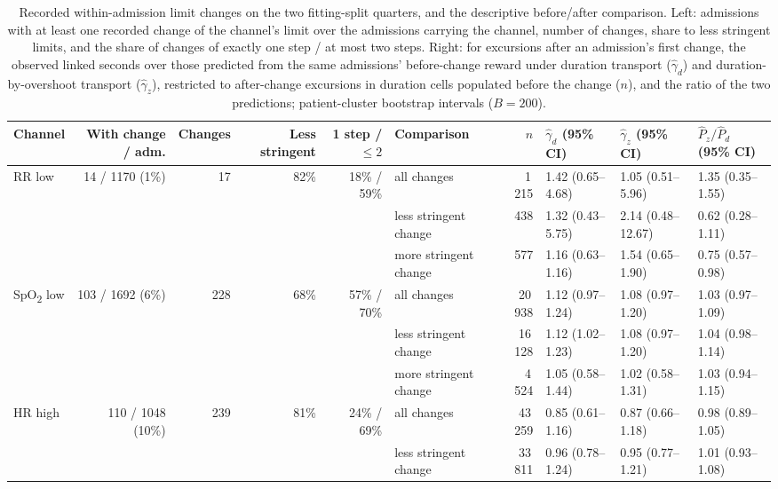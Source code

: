 \documentclass[11pt,letterpaper]{article}
\newcommand{\SpO}{SpO\textsubscript{2}}\newcommand{\tightnote}[1]{\par\smallskip{\footnotesize\raggedright #1\par}}
\begin{document}
\begin{landscape}\begin{table}[htbp]\centering\footnotesize
\setlength{\tabcolsep}{4pt}
\caption{Recorded within-admission limit changes on the two fitting-split quarters, and the descriptive before/after comparison. Left: admissions with at least one recorded change of the channel's limit over the admissions carrying the
channel, number of changes, share to less stringent limits, and the share of changes of exactly one step / at most two steps. Right: for
excursions after an admission's first change, the observed linked seconds over those predicted from the same
admissions' before-change reward under duration transport ($\hat\gamma_d$) and duration-by-overshoot transport
($\hat\gamma_z$), restricted to after-change excursions in duration cells populated before the change ($n$),
and the ratio of the two predictions; patient-cluster bootstrap intervals ($B=200$).}
\label{tab:limitchanges}
\begin{tabular}{@{}lrrrrlrlll@{}}
\toprule
Channel & With change / adm. & Changes & Less stringent & 1 step / $\le2$ & Comparison & $n$ & $\hat\gamma_d$ (95\% CI) & $\hat\gamma_z$ (95\% CI) & $\hat P_z/\hat P_d$ (95\% CI) \\
\midrule
RR low & 14 / 1170 (1\%) & 17 & 82\% & 18\% / 59\% & all changes & 1\,215 & 1.42 (0.65--4.68) & 1.05 (0.51--5.96) & 1.35 (0.35--1.55) \\
 &  &  &  &  & less stringent change & 438 & 1.32 (0.43--5.75) & 2.14 (0.48--12.67) & 0.62 (0.28--1.11) \\
 &  &  &  &  & more stringent change & 577 & 1.16 (0.63--1.16) & 1.54 (0.65--1.90) & 0.75 (0.57--0.98) \\
\addlinespace
\SpO{} low & 103 / 1692 (6\%) & 228 & 68\% & 57\% / 70\% & all changes & 20\,938 & 1.12 (0.97--1.24) & 1.08 (0.97--1.20) & 1.03 (0.97--1.09) \\
 &  &  &  &  & less stringent change & 16\,128 & 1.12 (1.02--1.23) & 1.08 (0.97--1.20) & 1.04 (0.98--1.14) \\
 &  &  &  &  & more stringent change & 4\,524 & 1.05 (0.58--1.44) & 1.02 (0.58--1.31) & 1.03 (0.94--1.15) \\
\addlinespace
HR high & 110 / 1048 (10\%) & 239 & 81\% & 24\% / 69\% & all changes & 43\,259 & 0.85 (0.61--1.16) & 0.87 (0.66--1.18) & 0.98 (0.89--1.05) \\
 &  &  &  &  & less stringent change & 33\,811 & 0.96 (0.78--1.24) & 0.95 (0.77--1.21) & 1.01 (0.93--1.08) \\

\end{tabular}
\end{table}
\end{landscape}
\end{document}
